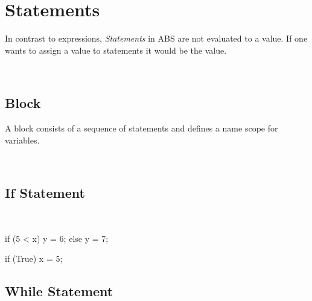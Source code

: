 \section{Statements}
In contrast to expressions, \emph{Statements} in ABS are not
evaluated to a value. If one wants to assign a value to statements
it would be the  value.

\begin{abssyntax}
     {}
                 {}
                 {}
                 {}
                 {}
                 {}
                 {}
                 {}
                 {}\\
  {}
                 {}
                 {}
\end{abssyntax}

\subsection{Block}
A block consists of a sequence of statements and defines a name scope for variables.



\begin{abssyntax}
  \TRS{\{}\ \ \TRS{\}}
\end{abssyntax}

\subsection{If Statement}

\begin{abssyntax}
  {}\ \TRS{(}  \TRS{)}\  
\end{abssyntax}

\begin{absexample}
if (5 < x) {
  y = 6;
} else {
  y = 7;
}

if (True)
  x = 5;
\end{absexample}

\subsection{While Statement}

